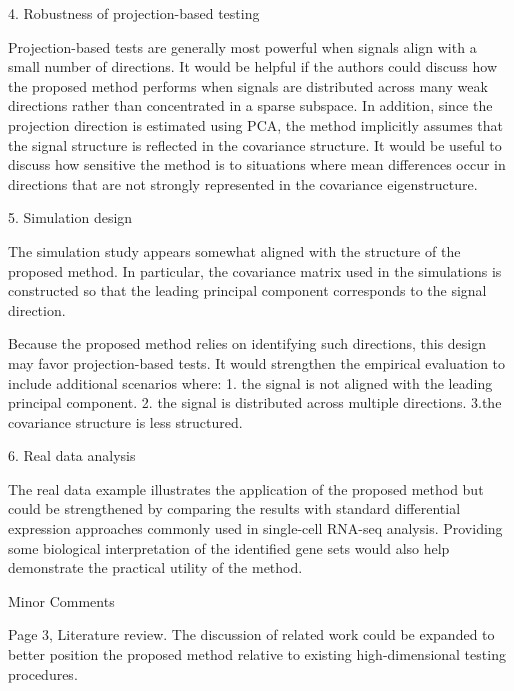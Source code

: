 \documentclass{article}
\theoremstyle{definition}
\begin{document}
\begin{shaded}
    4. Robustness of projection-based testing

Projection-based tests are generally most powerful when signals align with a small number of directions. It would be helpful if the authors could discuss how the proposed method performs when signals are distributed across many weak directions rather than concentrated in a sparse subspace. In addition, since the projection direction is estimated using PCA, the method implicitly assumes that the signal structure is reflected in the covariance structure. It would be useful to discuss how sensitive the method is to situations where mean differences occur in directions that are not strongly represented in the covariance eigenstructure.
\end{shaded}


\begin{shaded}
    5. Simulation design

The simulation study appears somewhat aligned with the structure of the proposed method. In particular, the covariance matrix used in the simulations is constructed so that the leading principal component corresponds to the signal direction.

Because the proposed method relies on identifying such directions, this design may favor projection-based tests. It would strengthen the empirical evaluation to include additional scenarios where: 1. the signal is not aligned with the leading principal component. 2. the signal is distributed across multiple directions. 3.the covariance structure is less structured.
\end{shaded}

\begin{shaded}
    6. Real data analysis

The real data example illustrates the application of the proposed method but could be strengthened by comparing the results with standard differential expression approaches commonly used in single-cell RNA-seq analysis. Providing some biological interpretation of the identified gene sets would also help demonstrate the practical utility of the method.
\end{shaded}

\begin{shaded}
Minor Comments

Page 3, Literature review.
The discussion of related work could be expanded to better position the proposed method relative to existing high-dimensional testing procedures.
\end{shaded}
\end{document}
